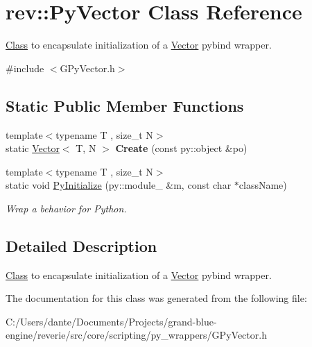 \hypertarget{classrev_1_1_py_vector}{}\section{rev\+::Py\+Vector Class Reference}
\label{classrev_1_1_py_vector}


\mbox{\hyperlink{struct_class}{Class}} to encapsulate initialization of a \mbox{\hyperlink{classrev_1_1_vector}{Vector}} pybind wrapper.  




{\ttfamily \#include $<$G\+Py\+Vector.\+h$>$}

\subsection*{Static Public Member Functions}
\begin{DoxyCompactItemize}
\item 
\mbox{\label{classrev_1_1_py_vector_a0af0c273dd1228969498e971818b07fd}} 
{\footnotesize template$<$typename T , size\+\_\+t N$>$ }\\static \mbox{\hyperlink{classrev_1_1_vector}{Vector}}$<$ T, N $>$ {\bfseries Create} (const py\+::object \&po)
\item 
\mbox{\label{classrev_1_1_py_vector_a42638b29ac2e1d1556c8ab1ad144b81e}} 
{\footnotesize template$<$typename T , size\+\_\+t N$>$ }\\static void \mbox{\hyperlink{classrev_1_1_py_vector_a42638b29ac2e1d1556c8ab1ad144b81e}{Py\+Initialize}} (py\+::module\+\_\+ \&m, const char $\ast$class\+Name)
\begin{DoxyCompactList}\small\item\em Wrap a behavior for Python. \end{DoxyCompactList}\end{DoxyCompactItemize}


\subsection{Detailed Description}
\mbox{\hyperlink{struct_class}{Class}} to encapsulate initialization of a \mbox{\hyperlink{classrev_1_1_vector}{Vector}} pybind wrapper. 

The documentation for this class was generated from the following file\+:\begin{DoxyCompactItemize}
\item 
C\+:/\+Users/dante/\+Documents/\+Projects/grand-\/blue-\/engine/reverie/src/core/scripting/py\+\_\+wrappers/G\+Py\+Vector.\+h\end{DoxyCompactItemize}
